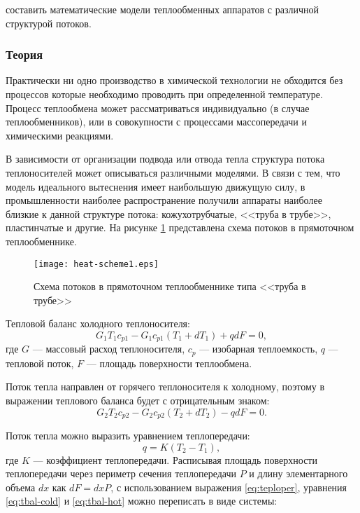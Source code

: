 
\goal составить математические модели теплообменных аппаратов с различной структурой потоков.

\subsubsection{Теория}
Практически ни одно производство в химической технологии не обходится без процессов которые необходимо проводить при определенной температуре. Процесс теплообмена может рассматриваться индивидуально (в случае теплообменников), или в совокупности с процессами массопередачи и химическими реакциями.

В зависимости от организации подвода или отвода тепла структура потока теплоносителей может описываться различными моделями. В связи с тем, что модель идеального вытеснения имеет наибольшую движущую силу, в промышленности наиболее распространение получили аппараты наиболее близкие к данной структуре потока: кожухотрубчатые, <<труба в трубе>>, пластинчатые и другие. На рисунке  \ref{fig:heat.scheme1} представлена схема потоков в прямоточном теплообменнике.

\begin{figure}[h]
	\begin{center}
		\texttt{[image: heat-scheme1.eps]}
	\end{center}
	\caption{Схема потоков в прямоточном теплообменнике типа <<труба в трубе>>} \label{fig:heat.scheme1}
\end{figure}

Тепловой баланс холодного теплоносителя:
\begin{equation}\label{eq:tbal-cold}
	G_1 T_1 c_{p1}-G_1 c_{p1} (T_1+ d T_1) + q d F=0,
\end{equation}
где $G$ --- массовый расход теплоносителя, $c_p$ --- изобарная теплоемкость, $q$ --- тепловой поток, $F$ --- площадь поверхности теплообмена.

Поток тепла направлен от горячего теплоносителя к холодному, поэтому в выражении теплового баланса будет с отрицательным знаком:
\begin{equation}\label{eq:tbal-hot}
	G_2 T_2 c_{p2} -G_2 c_{p2} (T_2 + d T_2) - q d F =0.
\end{equation}

Поток тепла можно выразить уравнением теплопередачи:
\begin{equation}\label{eq:teploper}
	q=K(T_2-T_1),
\end{equation}
где $K$ --- коэффициент теплопередачи. Расписывая площадь поверхности теплопередачи через периметр сечения теплопередачи $P$ и длину элементарного объема $d x$ как $d F = d x P$, с использованием выражения \eqref{eq:teploper}, уравнения \eqref{eq:tbal-cold} и \eqref{eq:tbal-hot} можно переписать в виде системы:

